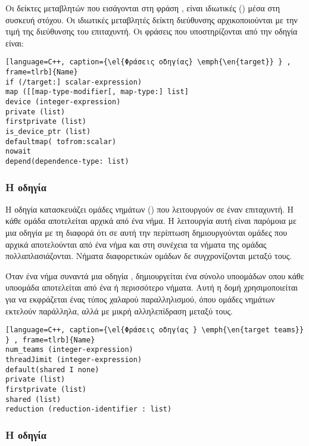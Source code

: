 Οι δείκτες μεταβλητών που εισάγονται στη φράση \emph{}, είναι ιδιωτικές (\emph{}) μέσα στη συσκευή
στόχου. Οι ιδιωτικές μεταβλητές δείκτη διεύθυνσης αρχικοποιούνται με την τιμή της διεύθυνσης του επιταχυντή. Οι φράσεις που υποστηρίζονται από την οδηγία είναι:

\begin{spacing}{0.9}
\begin{lstlisting}[language=C++, caption={\el{Φράσεις οδηγίας} \emph{\en{target}} } , frame=tlrb]{Name}
if (/target:] scalar-expression)
map ([[map-type-modifier[, map-type:] list]
device (integer-expression)
private (list)
firstprivate (list)
is_device_ptr (list)
defaultmap( tofrom:scalar)
nowait
depend(dependence-type: list)
\end{lstlisting}
\end{spacing}

\subsubsection{Η οδηγία }
Η οδηγία \emph{} κατασκευάζει ομάδες νημάτων (\emph{}) που λειτουργούν σε έναν επιταχυντή. Η κάθε ομάδα αποτελείται αρχικά από ένα νήμα. Η λειτουργία αυτή είναι παρόμοια με μια οδηγία \emph{} με τη διαφορά ότι σε αυτή την περίπτωση δημιουργούνται ομάδες που αρχικά αποτελούνται από ένα νήμα και στη συνέχεια τα νήματα της ομάδας πολλαπλασιάζονται. Νήματα διαφορετικών ομάδων δε συγχρονίζονται μεταξύ τους.

Όταν ένα νήμα συναντά μια οδηγία , δημιουργείται ένα σύνολο υποομάδων οπου κάθε υποομάδα αποτελείται από ένα ή περισσότερο νήματα. Αυτή η δομή χρησιμοποιείται για να εκφράζεται ένας τύπος χαλαρού παραλληλισμού, όπου ομάδες νημάτων εκτελούν παράλληλα, αλλά με μικρή αλληλεπίδραση μεταξύ τους.


\begin{spacing}{1.0}
\begin{lstlisting}[language=C++, caption={\el{Φράσεις οδηγίας } \emph{\en{target teams}} } , frame=tlrb]{Name}
num_teams (integer-expression)
threadJimit (integer-expression)
default(shared I none)
private (list)
firstprivate (list)
shared (list)
reduction (reduction-identifier : list)
\end{lstlisting}
\end{spacing}
\subsubsection{Η οδηγία }

